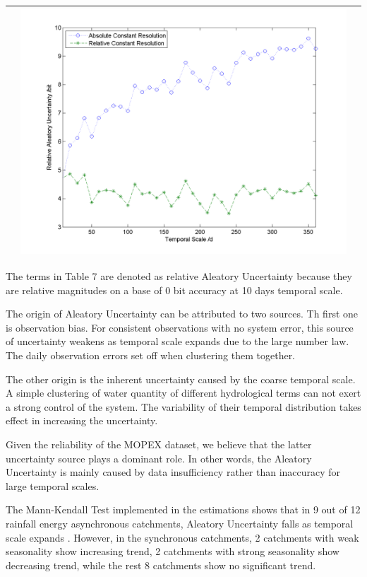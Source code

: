 \documentclass[11pt]{article}
\begin{document}
\begin{table}[H]
{\begin{tabular}{ccc}
&\begin{minipage}{.6\textwidth}\includegraphics[width=\linewidth]{resultgraph/11532500AU.png}\end{minipage}
\\
\bottomrule
\end{tabular}
}
\end{table}   

The terms in Table 7 are denoted as relative Aleatory Uncertainty  because they are relative magnitudes on a base of 0 bit accuracy at 10 days temporal scale. 

The origin of Aleatory Uncertainty can be attributed to two sources. Th first one is  observation bias. For consistent observations with no system error, this source of uncertainty    weakens as temporal scale expands  due to the large number law. The daily observation errors set off when clustering them together. 

The other origin is the inherent uncertainty caused by the coarse temporal scale. A simple clustering of water quantity of different hydrological terms can not exert a strong control of the system. The variability of their temporal distribution takes effect in increasing the uncertainty. 

Given the reliability of the MOPEX dataset, we believe that the latter uncertainty source plays a dominant role. In other words, the Aleatory Uncertainty is mainly caused by data insufficiency rather than inaccuracy for large temporal scales. 

The Mann-Kendall Test  implemented in the estimations shows  that in 9 out of 12 rainfall energy asynchronous catchments, Aleatory Uncertainty falls as temporal scale expands . However, in the synchronous catchments, 2 catchments with weak seasonality show increasing trend, 2 catchments with strong seasonality show decreasing trend, while the rest 8 catchments show no significant trend.  
\end{document}
